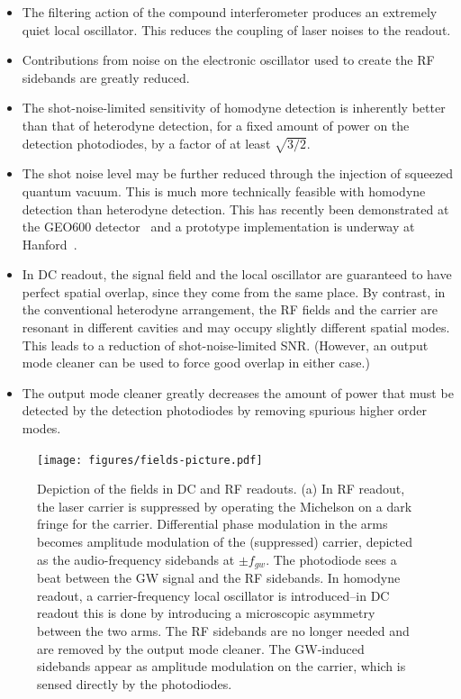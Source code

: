 \begin{itemize}
\item The filtering action of the compound interferometer produces an
  extremely quiet local oscillator.  This reduces the coupling of
  laser noises to the readout.
\item Contributions from noise on the electronic oscillator used to
  create the RF sidebands are greatly reduced.
\item The shot-noise-limited sensitivity of homodyne detection is
  inherently better than that of heterodyne detection, for a fixed
  amount of power on the detection photodiodes, by a factor of at
  least $\sqrt{3/2}$.
\item The shot noise level may be further reduced through the
  injection of squeezed quantum vacuum.  This is much more technically
  feasible with homodyne detection than heterodyne detection.  This
  has recently been demonstrated at the GEO600 detector~\cite{GeoSqueezingNature2011,Vahlbruch2010GEO} and a
  prototype implementation is underway at Hanford~\cite{H1SqueezerProposal}.
\item In DC readout, the signal field and the local oscillator are
  guaranteed to have perfect spatial overlap, since they come from the
  same place.  By contrast, in the conventional heterodyne
  arrangement, the RF fields and the carrier are resonant in different
  cavities and may occupy slightly different spatial modes.  This
  leads to a reduction of shot-noise-limited SNR.  (However, an output
  mode cleaner can be used to force good overlap in either case.)
\item The output mode cleaner greatly decreases the amount of power
  that must be detected by the detection photodiodes by removing
  spurious higher order modes.    
\end{itemize}

\begin{figure}[p]
\texttt{[image: figures/fields-picture.pdf]}
\caption[Frequency-domain fields in DC and RF
  readouts]{\label{fig:sideband-picture}Depiction of the fields in DC
  and RF readouts.  (a) In RF readout, the laser carrier is suppressed
  by operating the Michelson on a dark fringe for the carrier.
  Differential phase modulation in the arms becomes amplitude
  modulation of the (suppressed) carrier, depicted as the
  audio-frequency sidebands at $\pm f_{gw}$.  The photodiode sees a
  beat between the GW signal and the RF sidebands.  In homodyne
  readout, a carrier-frequency local oscillator is introduced--in DC
  readout this is done by introducing a microscopic asymmetry between
  the two arms.  The RF sidebands are no longer needed and are removed
  by the output mode cleaner.  The GW-induced sidebands appear as
  amplitude modulation on the carrier, which is sensed directly by the
  photodiodes.}
\end{figure}

